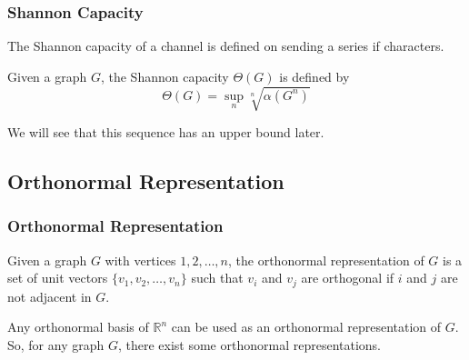\documentclass{beamer}
\begin{document}
                  \begin{frame}
                        \frametitle{Shannon Capacity}
                        \begin{definition}\label{def:shannonCapacity}
                              The Shannon capacity of a channel is defined on sending a series if characters.

                              \pause

                              Given a graph $ G $, the Shannon capacity $ \Theta(G) $ is defined by
                              \begin{equation}
                                    \Theta(G) = \sup_{n} \sqrt[n]{\alpha(G^n)} 
                              \end{equation}

                              \pause

                              We will see that this sequence has an upper bound later. 
                        \end{definition}
                  \end{frame}

            \subsection{Orthonormal Representation}

                  \begin{frame}
                        \frametitle{Orthonormal Representation}
                        \begin{definition}\label{def:orthonormalRepresentation}
                              Given a graph $ G $ with vertices $ 1,2,\dots,n $, the orthonormal representation of $ G $ is a set of unit vectors $ \{v_1, v_2, \dots, v_n\} $ such that $ v_i $ and $ v_j $ are orthogonal if $ i $ and $ j $ are not adjacent in $ G $.
                        \end{definition}

                        \pause

                        Any orthonormal basis of $ \mathbb{R}^n $ can be used as an orthonormal representation of $ G $. So, for any graph $ G $, there exist some orthonormal representations.
                  \end{frame}
\end{document}

